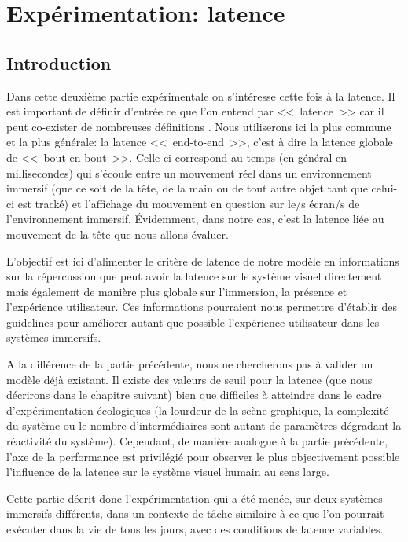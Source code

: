 \part{Expérimentation: latence}

\chapter*{Introduction}
\par Dans cette deuxième partie expérimentale on s'intéresse cette fois à la latence. Il est important de définir d'entrée ce que l'on entend par <<~latence~>> car il peut co-exister de nombreuses définitions \citep{papadakis_system_2011, hale_handbook_2015, watson_effects_1998}. Nous utiliserons ici la plus commune et la plus générale: la latence <<~end-to-end~>>, c'est à dire la latence globale de <<~bout en bout~>>. Celle-ci correspond au temps (en général en millisecondes) qui s'écoule entre un mouvement réel dans un environnement immersif (que ce soit de la tête, de la main ou de tout autre objet tant que celui-ci est tracké) et l'affichage du mouvement en question sur le/s écran/s de l'environnement immersif. Évidemment, dans notre cas, c'est la latence liée au mouvement de la tête que nous allons évaluer.

\par L'objectif est ici d'alimenter le critère de latence de notre modèle en informations sur la répercussion que peut avoir la latence sur le système visuel directement mais également de manière plus globale sur l'immersion, la présence et l'expérience utilisateur. Ces informations pourraient nous permettre d'établir des guidelines pour améliorer autant que possible l'expérience utilisateur dans les systèmes immersifs.

\par A la différence de la partie précédente, nous ne chercherons pas à valider un modèle déjà existant. Il existe des valeurs de seuil pour la latence (que nous décrirons dans le chapitre suivant) bien que difficiles à atteindre dans le cadre d'expérimentation écologiques (la lourdeur de la scène graphique, la complexité du système ou le nombre d'intermédiaires sont autant de paramètres dégradant la réactivité du système). Cependant, de manière analogue à la partie précédente, l'axe de la performance est privilégié pour observer le plus objectivement possible l'influence de la latence sur le système visuel humain au sens large.

\par Cette partie décrit donc l'expérimentation qui a été menée, sur deux systèmes immersifs différents, dans un contexte de tâche similaire à ce que l'on pourrait exécuter dans la vie de tous les jours, avec des conditions de latence variables.
